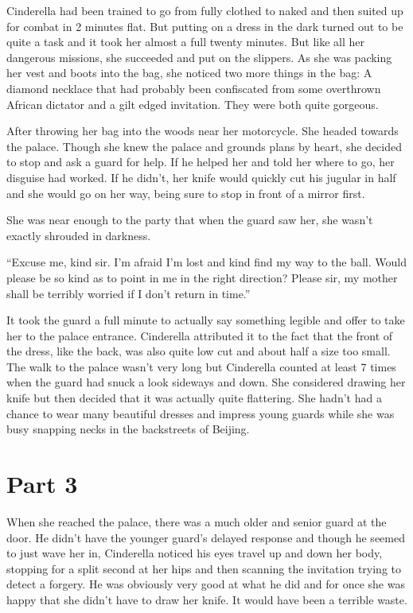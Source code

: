 \documentclass[12pt,letterpaper]{article}
\begin{document}
Cinderella had been trained to go from fully clothed to naked and then suited up for combat in 2 minutes flat. But putting on a dress in the dark turned out to be quite a task and it took her almost a full twenty minutes. But like all her dangerous missions, she succeeded and put on the slippers. As she was packing her vest and boots into the bag, she noticed two more things in the bag: A diamond necklace that had probably been confiscated from some overthrown African dictator and a gilt edged invitation. They were both quite gorgeous.

After throwing her bag into the woods near her motorcycle. She headed towards the palace. Though she knew the palace and grounds plans by heart, she decided to stop and ask a guard for help. If he helped her and told her where to go, her disguise had worked. If he didn't, her knife would quickly cut his jugular in half and she would go on her way, being sure to stop in front of a mirror first.

She was near enough to the party that when the guard saw her, she wasn't exactly shrouded in darkness.

``Excuse me, kind sir. I'm afraid I'm lost and kind find my way to the ball. Would please be so kind as to point in me in the right direction? Please sir, my mother shall be terribly worried if I don't return in time.''

It took the guard a full minute to actually say something legible and offer to take her to the palace entrance. Cinderella attributed it to the fact that the front of the dress, like the back, was also quite low cut and about half a size too small. The walk to the palace wasn't very long but Cinderella counted at least 7 times when the guard had snuck a look sideways and down. She considered drawing her knife but then decided that it was actually quite flattering. She hadn't had a chance to wear many beautiful dresses and impress young guards while she was busy snapping necks in the backstreets of Beijing.

\section*{Part 3}

When she reached the palace, there was a much older and senior guard at the door. He didn't have the younger guard's delayed response and though he seemed to just wave her in, Cinderella noticed his eyes travel up and down her body, stopping for a split second at her hips and then scanning the invitation trying to detect a forgery. He was obviously very good at what he did and for once she was happy that she didn't have to draw her knife. It would have been a terrible waste.
\end{document}
